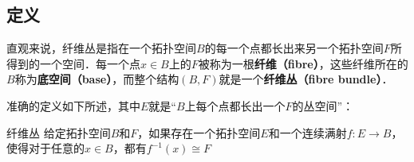 
\subsection{定义}

直观来说，纤维丛是指在一个拓扑空间$B$的每一个点都长出来另一个拓扑空间$F$所得到的一个空间．每一个点$x\in B$上的$F$被称为一根\textbf{纤维（fibre）}，这些纤维所在的$B$称为\textbf{底空间（base）}，而整个结构$(B, F)$就是一个\textbf{纤维丛（fibre bundle）}．

准确的定义如下所述，其中$E$就是“$B$上每个点都长出一个$F$的丛空间”：

\begin{definition}{纤维丛}
给定拓扑空间$B$和$F$，如果存在一个拓扑空间$E$和一个连续满射$f:E\rightarrow B$，使得对于任意的$x\in B$，都有$f^{-1}(x)\cong F$
\end{definition}






